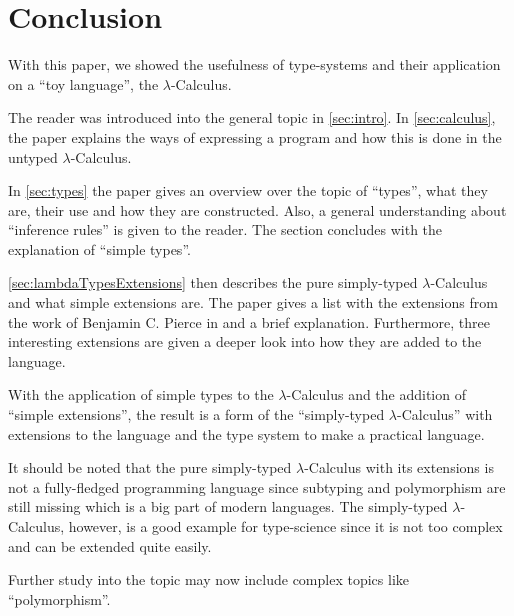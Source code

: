 \section{Conclusion}

With this paper, we showed the usefulness of type-systems
and their application on a ``toy language'', the $\lambda$-Calculus.

The reader was introduced into the general topic in \cref{sec:intro}.
In \cref{sec:calculus}, the paper explains the ways of expressing
a program and how this is done in the untyped $\lambda$-Calculus.

In \cref{sec:types} the paper gives an overview over
the topic of ``types'', what they are, their use and
how they are constructed. Also, a general understanding about
``inference rules'' is given to the reader. The section
concludes with the explanation of ``simple types''.

\cref{sec:lambdaTypesExtensions} then describes the
pure simply-typed $\lambda$-Calculus and what simple extensions
are. The paper gives a list with the extensions from the work
of Benjamin C. Pierce in \cite{pierce2002ProgLang} and a brief
explanation. Furthermore, three interesting extensions are
given a deeper look into how they are added to the language.

With the application of simple types to the $\lambda$-Calculus
and the addition of ``simple extensions'', the result is a form of the
``simply-typed $\lambda$-Calculus'' with extensions to
the language and the type system to make a practical language.

It should be noted that the pure simply-typed $\lambda$-Calculus
with its extensions is not a fully-fledged programming language since
subtyping and polymorphism are still missing which is a big part of
modern languages. The simply-typed $\lambda$-Calculus, however, is
a good example for type-science since it is not too complex and
can be extended quite easily.

Further study into the topic may now include complex topics like
``polymorphism''.
